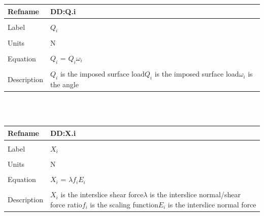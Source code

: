 \documentclass[12pt]{article}
\begin{document}
\noindent \begin{minipage}{\textwidth}
\begin{tabular}{p{} p{}}
\toprule \textbf{Refname} & \textbf{DD:Q.i}
\label{DD:Q.i}
\\ \midrule \\
Label & $Q_{i}$
\\ \midrule \\
Units & N
\\ \midrule \\
Equation & $Q_{i}$ = $Q_{i}\omega{}_{i}$
\\ \midrule \\
Description & $Q_{i}$ is the imposed surface load\newline$Q_{i}$ is the imposed surface load\newline$\omega{}_{i}$ is the angle
\\ \bottomrule \end{tabular}
\end{minipage}\\
~\newline
\noindent \begin{minipage}{\textwidth}
\begin{tabular}{p{} p{}}
\toprule \textbf{Refname} & \textbf{DD:X.i}
\label{DD:X.i}
\\ \midrule \\
Label & $X_{i}$
\\ \midrule \\
Units & N
\\ \midrule \\
Equation & $X_{i}$ = $\lambda{}f_{i}E_{i}$
\\ \midrule \\
Description & $X_{i}$ is the interslice shear force\newline$\lambda{}$ is the interslice normal/shear force ratio\newline$f_{i}$ is the scaling function\newline$E_{i}$ is the interslice normal force
\\ \bottomrule \end{tabular}
\end{minipage}\\
~\newline
\end{document}
